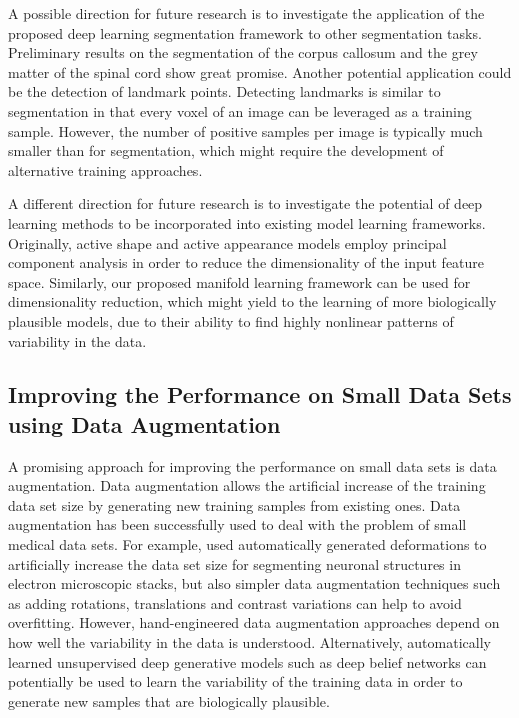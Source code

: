A possible direction for future research is to investigate the application of
the proposed deep learning segmentation framework to other segmentation tasks.
Preliminary results on the segmentation of the corpus callosum and the grey
matter of the spinal cord show great promise. Another potential application
could be the detection of landmark points. Detecting landmarks is similar to
segmentation in that every voxel of an image can be leveraged as a training
sample. However, the number of positive samples per image is typically much
smaller than for segmentation, which might require the development of
alternative training approaches.


A different direction for future research is to investigate the potential of
deep learning methods to be incorporated into existing model learning
frameworks. Originally, active shape \citep{cootes1995} and active appearance
\citep{cootes2001} models employ principal component analysis in order to reduce
the dimensionality of the input feature space. Similarly, our proposed manifold
learning framework can be used for dimensionality reduction, which might yield
to the learning of more biologically plausible models, due to their ability to
find highly nonlinear patterns of variability in the data.

\subsection[Improving the performance on small data sets using data
augmentation]{Improving the Performance on Small Data Sets using Data
Augmentation}

A promising approach for improving the performance on small data sets is data
augmentation. Data augmentation allows the artificial increase of the training
data set size by generating new training samples from existing ones. Data
augmentation has been successfully used to deal with the problem of small
medical data sets. For example, \citet{ronneberger2015} used automatically
generated deformations to artificially increase the data set size for segmenting
neuronal structures in electron microscopic stacks, but also simpler data
augmentation techniques such as adding rotations, translations and contrast
variations can help to avoid overfitting. However, hand-engineered data
augmentation approaches depend on how well the variability in the data is
understood. Alternatively, automatically learned unsupervised deep generative
models such as deep belief networks can potentially be used to learn the
variability of the training data in order to generate new samples that are
biologically plausible.

